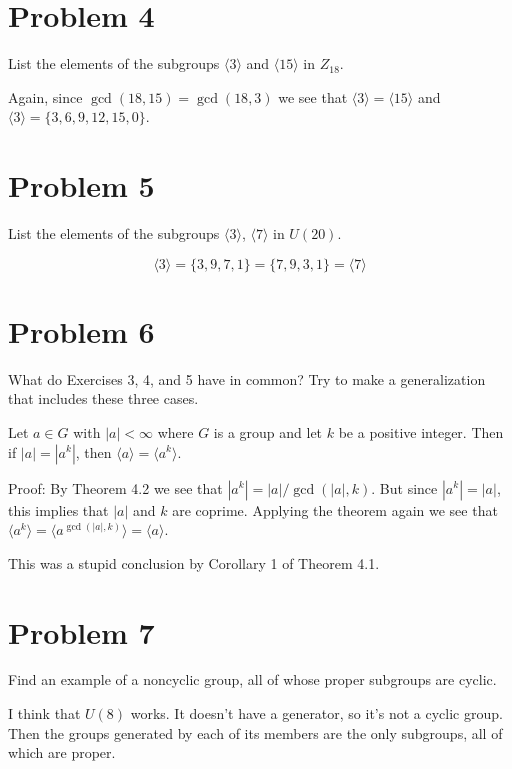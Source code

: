 \documentclass{article}
\begin{document}
\section*{Problem 4}

List the elements of the subgroups $\langle 3\rangle$ and $\langle 15\rangle$
in $Z_{18}$.

Again, since $\gcd(18,15)=\gcd(18,3)$ we see that $\langle 3\rangle=\langle 15\rangle$
and $\langle 3\rangle=\{ 3, 6, 9, 12, 15, 0 \}$.

\section*{Problem 5}

List the elements of the subgroups $\langle 3\rangle$, $\langle 7\rangle$ in $U(20)$.

\begin{equation*}
\langle 3\rangle = \{ 3, 9, 7, 1 \} = \{ 7, 9, 3, 1 \} = \langle 7\rangle
\end{equation*}

\newcommand{\lcm}{\mbox{lcm}}

\section*{Problem 6}

What do Exercises 3, 4, and 5 have in common?  Try to make a generalization
that includes these three cases.

Let $a\in G$ with $|a|<\infty$ where $G$ is a group and let $k$ be a positive integer.
Then if $|a|=|a^k|$, then $\langle a\rangle=\langle a^k\rangle$.

Proof: By Theorem 4.2 we see that $|a^k|=|a|/\gcd(|a|,k)$.  But since
$|a^k|=|a|$, this implies that $|a|$ and $k$ are coprime.  Applying the
theorem again we see that
$\langle a^k\rangle=\langle a^{\gcd(|a|,k)}\rangle=\langle a\rangle$.

This was a stupid conclusion by Corollary 1 of Theorem 4.1.

\section*{Problem 7}

Find an example of a noncyclic group, all of whose proper
subgroups are cyclic.

I think that $U(8)$ works.  It doesn't have a generator, so it's
not a cyclic group.  Then the groups generated by each of its members
are the only subgroups, all of which are proper.
\end{document}
